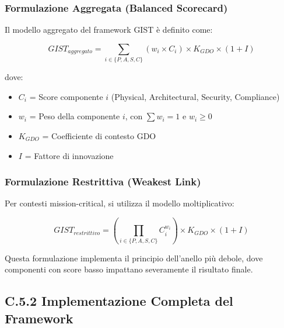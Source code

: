 \subsubsection{Formulazione Aggregata (Balanced Scorecard)}

Il modello aggregato del framework GIST è definito come:

\begin{equation}
GIST_{aggregato} = \sum_{i \in \{P,A,S,C\}} (w_i \times C_i) \times K_{GDO} \times (1+I)
\end{equation}

dove:
\begin{itemize}
    \item $C_i$ = Score componente $i$ (Physical, Architectural, Security, Compliance)
    \item $w_i$ = Peso della componente $i$, con $\sum w_i = 1$ e $w_i \geq 0$
    \item $K_{GDO}$ = Coefficiente di contesto GDO
    \item $I$ = Fattore di innovazione
\end{itemize}

\subsubsection{Formulazione Restrittiva (Weakest Link)}

Per contesti mission-critical, si utilizza il modello moltiplicativo:

\begin{equation}
GIST_{restrittivo} = \left(\prod_{i \in \{P,A,S,C\}} C_i^{w_i}\right) \times K_{GDO} \times (1+I)
\end{equation}

Questa formulazione implementa il principio dell'anello più debole, dove componenti con score basso impattano severamente il risultato finale.

\subsection{\texorpdfstring{\textbf{C.5.2 Implementazione Completa del Framework}}{C.5.2 - Implementazione Completa del Framework}}

